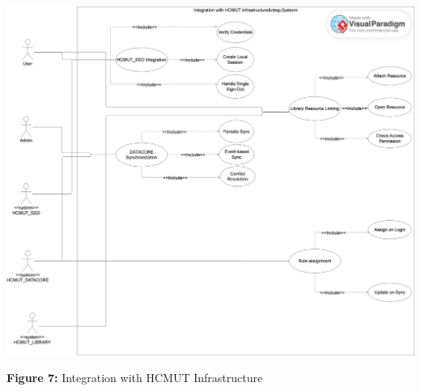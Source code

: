 
\begin{center}
\includegraphics[width=0.9\linewidth]{images/UC-06.png}
\end{center}

\begin{center}
\textbf{Figure 7:}  Integration with HCMUT Infrastructure
\end{center}


